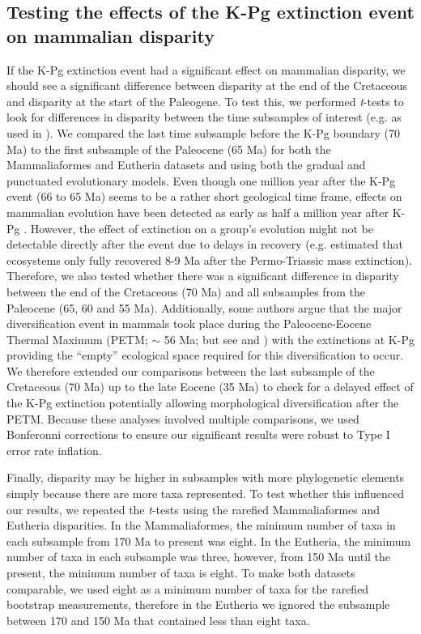 \documentclass[10pt,letterpaper]{article}
\begin{document}
\subsection*{Testing the effects of the K-Pg extinction event on mammalian disparity}
If the K-Pg extinction event had a significant effect on mammalian disparity, we should see a significant difference between disparity at the end of the Cretaceous and disparity at the start of the Paleogene.
To test this, we performed \textit{t}-tests to look for differences in disparity between the time subsamples of interest (e.g. as used in \cite{anderson2012using,zelditch2012geometric,smith2014joined}).
We compared the last time subsample before the K-Pg boundary (70 Ma) to the first subsample of the Paleocene (65 Ma) for both the Mammaliaformes and Eutheria datasets and using both the gradual and punctuated evolutionary models.
Even though one million year after the K-Pg event (66 to 65 Ma) seems to be a rather short geological time frame, effects on mammalian evolution have been detected as early as half a million year after K-Pg \cite{Wilson2013}.
However, the effect of extinction on a group's evolution might not be detectable directly after the event due to delays in recovery (e.g. \cite{chen2012timing} estimated that ecosystems only fully recovered 8-9 Ma after the Permo-Triassic mass extinction).
Therefore, we also tested whether there was a significant difference in disparity between the end of the Cretaceous (70 Ma) and all subsamples from the Paleocene (65, 60 and 55 Ma).
Additionally, some authors argue that the major diversification event in mammals took place during the Paleocene-Eocene Thermal Maximum (PETM; $\sim$ 56 Ma; \cite{bininda2007delayed} but see \cite{meredithimpacts2011} and \cite{Stadler12042011}) with the extinctions at K-Pg providing the ``empty'' ecological space required for this diversification to occur.
We therefore extended our comparisons between the last subsample of the Cretaceous (70 Ma) up to the late Eocene (35 Ma) to check for a delayed effect of the K-Pg extinction potentially allowing morphological diversification after the PETM. 
Because these analyses involved multiple comparisons, we used Bonferonni corrections \cite{holm1979simple} to ensure our significant results were robust to Type I error rate inflation. 

Finally, disparity may be higher in subsamples with more phylogenetic elements simply because there are more taxa represented.
To test whether this influenced our results, we repeated the \textit{t}-tests using the rarefied Mammaliaformes and Eutheria disparities.
In the Mammaliaformes, the minimum number of taxa in each subsample from 170 Ma to present was eight.
In the Eutheria, the minimum number of taxa in each subsample was three, however, from 150 Ma until the present, the minimum number of taxa is eight.
To make both datasets comparable, we used eight as a minimum number of taxa for the rarefied bootstrap measurements, therefore in the Eutheria we ignored the subsample between 170 and 150 Ma that contained less than eight taxa.
\end{document}
